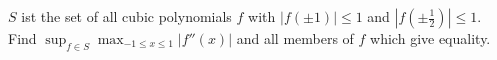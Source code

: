 $S$ ist the set of all cubic polynomials $f$ with $|f(\pm 1)| \leq 1$ and $|f(\pm \frac{1}{2})| \leq 1$. Find $\sup_{f \in S} \max_{-1 \leq x \leq 1} |f''(x)|$ and all members of $f$ which give equality.